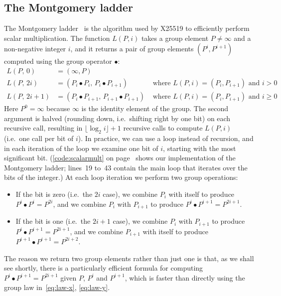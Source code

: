 \documentclass[manuscript]{acmart}
\begin{document}
\subsection{The Montgomery ladder}\label{sec:ladder}

The Montgomery ladder~\cite{Bernstein:2017fm,Costello:2018,Montgomery:1987fz} is the algorithm used by X25519 to efficiently perform scalar multiplication.
The function $L(P, i)$ takes a group element $P \ne \infty$ and a non-negative integer $i$, and it returns a pair of group elements $(P^i, P^{i+1})$ computed using the group operator $\bullet$:
\begin{align}
L(P,\, 0) &= (\infty, P) \label{eq:ladder}\\
L(P,\, 2i) &= (P_i \bullet P_i,\, P_i \bullet P_{i+1}) & \text{ where } L(P, i) = (P_i, P_{i+1}) \text{ and } i>0 \nonumber\\
L(P,\, 2i+1) &= (P_i \bullet P_{i+1},\, P_{i+1} \bullet P_{i+1}) & \text{ where } L(P, i) = (P_i, P_{i+1}) \text{ and } i \ge 0 \nonumber
\end{align}
Here $P^0 = \infty$ because $\infty$ is the identity element of the group.
The second argument is halved (rounding down, i.e.\ shifting right by one bit) on each recursive call, resulting in $\lfloor\log_2 i\rfloor + 1$ recursive calls to compute $L(P, i)$ (i.e.\ one call per bit of $i$).
In practice, we can use a loop instead of recursion, and in each iteration of the loop we examine one bit of $i$, starting with the most significant bit.
(\autoref{code:scalarmult} on page~\pageref{code:scalarmult} shows our implementation of the Montgomery ladder; lines~19 to~43 contain the main loop that iterates over the bits of the integer.)
At each loop iteration we perform two group operations:
\begin{itemize}
\item If the bit is zero (i.e.\ the $2i$ case), we combine $P_i$ with itself to produce $P^i \bullet P^i = P^{2i}$, and we combine $P_i$ with $P_{i+1}$ to produce $P^i \bullet P^{i+1} = P^{2i+1}$.
\item If the bit is one (i.e.\ the $2i+1$ case), we combine $P_i$ with $P_{i+1}$ to produce $P^i \bullet P^{i+1} = P^{2i+1}$, and we combine $P_{i+1}$ with itself to produce $P^{i+1} \bullet P^{i+1} = P^{2i+2}$.
\end{itemize}

The reason we return two group elements rather than just one is that, as we shall see shortly, there is a particularly efficient formula for computing $P^i \bullet P^{i+1} = P^{2i+1}$ given $P$, $P^i$ and $P^{i+1}$, which is faster than directly using the group law in~\eqref{eq:law-x}, \eqref{eq:law-y}.
\end{document}
